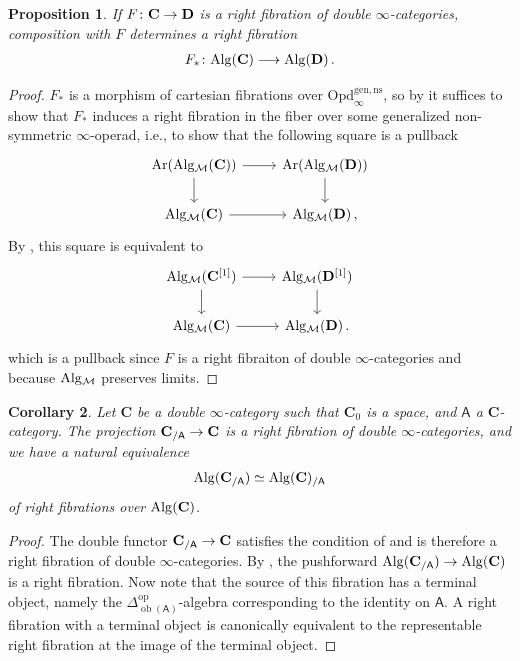 \documentclass[10pt]{amsart}
\numberwithin{equation}{section}
\newtheorem{prop}{Proposition}[subsection]
\newtheorem{cor}[prop]{Corollary}
\theoremstyle{definition}
\DeclareMathOperator{\ob}{ob}
\DeclareMathOperator{\op}{op}
\DeclareMathOperator{\Ar}{Ar}
\newcommand{\Alg}{\mathrm{Alg}\vphantom{z}}
\newcommand{\Simp}{\mathbb{\Delta}}
\newcommand{\cM}{\mathcal{M}}
\newcommand{\bfC}{\mathbf{C}}
\newcommand{\bfD}{\mathbf{D}}
\newcommand{\sfA}{\mathsf{A}}
\newcommand{\Opd}{\mathrm{Opd}^{\mathrm{gen,ns}}_{\infty}}
\renewcommand{\to}{\mathchoice{\longrightarrow}{\rightarrow}{}{}}
\begin{document}
	\begin{prop}\label{prop:algebra_right_fib}
		If $F\colon \bfC \to \bfD$ is a right fibration of double $\infty$-categories, composition with $F$ determines a right fibration
		\begin{align*}
			F_{*}\colon \Alg(\bfC) \to \Alg(\bfD) \,.
		\end{align*}
	\end{prop}
	\begin{proof}
		$F_{*}$ is a morphism of cartesian fibrations over $\Opd$, so by  it suffices to show that $F_{*}$ induces a right fibration in the fiber over some generalized non-symmetric $\infty$-operad, i.e., to show that the following square is a pullback
		\begin{equation*}
			\begin{tikzcd}
				\Ar(\Alg_{\cM}(\bfC)) \arrow[r] \arrow[d]      &  \Ar(\Alg_{\cM}(\bfD))    \arrow[d] \\
				\Alg_{\cM}(\bfC) \arrow[r]                &\Alg_{\cM}(\bfD) \, ,
			\end{tikzcd}
		\end{equation*}
		By , this square is equivalent to
		\begin{equation*}
			\begin{tikzcd}
				\Alg_{\cM}(\bfC^{[1]})  \arrow[r] \arrow[d]      &    \Alg_{\cM}(\bfD^{[1]})  \arrow[d] \\
				\Alg_{\cM}(\bfC)  \arrow[r]                & \Alg_{\cM}(\bfD) \,.
			\end{tikzcd}
		\end{equation*}
		which is a pullback since $F$ is a right fibraiton of double $\infty$-categories and because $\Alg_{\cM}$ preserves limits.
	\end{proof}

	\begin{cor}\label{cor:alg_in_slice}
		Let $\bfC$ be a double $\infty$-category such that $\bfC_{0}$ is a space, and $\sfA$ a $\bfC$-category. The projection $\bfC_{/ \sfA} \to \bfC$ is a right fibration of double $\infty$-categories, and we have a natural equivalence
		\begin{align*}
			\Alg(\bfC_{/\sfA}) \simeq \Alg(\bfC)_{/\sfA}
		\end{align*}
    of right fibrations	over $\Alg(\bfC)$.
	\end{cor}
	\begin{proof}
		The double functor $\bfC_{/ \sfA} \to \bfC$ satisfies the condition of  and is therefore a right fibration of double $\infty$-categories.
    By , the pushforward $\Alg(\bfC_{/\sfA})\to \Alg(\bfC)$ is a right fibration.
    Now note that the source of this fibration has a terminal object, namely the $\Simp^{\op}_{\ob(\sfA)}$-algebra corresponding to the identity on $\sfA$.
    A right fibration with a terminal object is canonically equivalent to the representable right fibration at the image of the terminal object.
	\end{proof}
\end{document}
